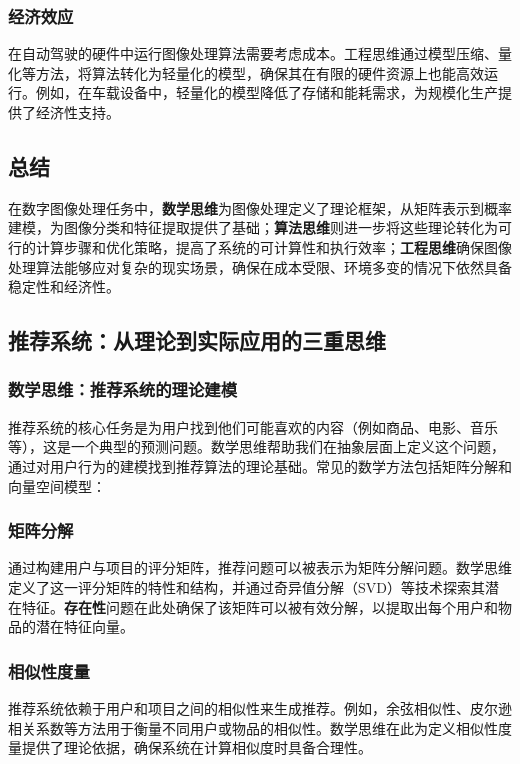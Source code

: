 \subsubsection*{经济效应}

在自动驾驶的硬件中运行图像处理算法需要考虑成本。工程思维通过模型压缩、量化等方法，将算法转化为轻量化的模型，确保其在有限的硬件资源上也能高效运行。例如，在车载设备中，轻量化的模型降低了存储和能耗需求，为规模化生产提供了经济性支持。

\subsection{  总结}

在数字图像处理任务中，{\bf 数学思维}为图像处理定义了理论框架，从矩阵表示到概率建模，为图像分类和特征提取提供了基础；{\bf 算法思维}则进一步将这些理论转化为可行的计算步骤和优化策略，提高了系统的可计算性和执行效率；{\bf 工程思维}确保图像处理算法能够应对复杂的现实场景，确保在成本受限、环境多变的情况下依然具备稳定性和经济性。

\subsection{推荐系统：从理论到实际应用的三重思维}


\subsubsection{ 数学思维：推荐系统的理论建模}
推荐系统的核心任务是为用户找到他们可能喜欢的内容（例如商品、电影、音乐等），这是一个典型的预测问题。数学思维帮助我们在抽象层面上定义这个问题，通过对用户行为的建模找到推荐算法的理论基础。常见的数学方法包括矩阵分解和向量空间模型：

\subsubsection*{矩阵分解}
通过构建用户与项目的评分矩阵，推荐问题可以被表示为矩阵分解问题。数学思维定义了这一评分矩阵的特性和结构，并通过奇异值分解（SVD）等技术探索其潜在特征。{\bf 存在性}问题在此处确保了该矩阵可以被有效分解，以提取出每个用户和物品的潜在特征向量。
  
\subsubsection*{相似性度量}
推荐系统依赖于用户和项目之间的相似性来生成推荐。例如，余弦相似性、皮尔逊相关系数等方法用于衡量不同用户或物品的相似性。数学思维在此为定义相似性度量提供了理论依据，确保系统在计算相似度时具备合理性。

